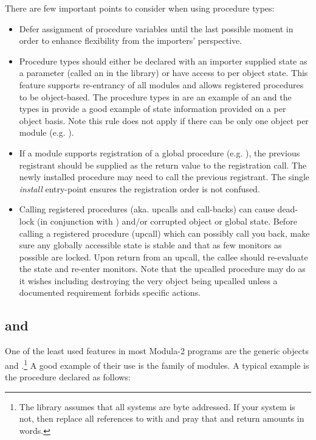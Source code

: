 There are few important points to consider when using procedure types:
\begin{itemize}
\item
    Defer assignment of procedure variables until the last possible moment
    in order to enhance flexibility from the importers' perspective.  
\item
    Procedure types should either be declared with an importer supplied
    state as a parameter (called an  in the library) 
    or have access 
    to per object state.  This feature supports re-entrancy of all modules and
    allows registered procedures to be object-based.  The procedure types
    in 
    are an example of an  and the types in
     provide a good example of state information
    provided on a per object basis.
    Note this rule does not apply if there can be only one object per module
    (e.g. ).
\item {}
    If a module supports registration of a global procedure
    (e.g. ), the previous registrant should
    be supplied as the return value to the registration call. 
    The newly installed procedure may need to call the previous registrant.
    The single {\em install} entry-point ensures the registration order
    is not confused.
\item {} 
    Calling registered procedures (aka. upcalls and call-backs)
    can cause dead-lock
    (in conjunction with ) and/or
    corrupted object or global state.
    Before calling a registered procedure (upcall)
    which can possibly call you back, make sure any globally accessible
    state is stable
    and that as few monitors as possible are locked.  Upon return from
    an upcall, the callee should re-evaluate the state and re-enter
    monitors.  Note that the upcalled procedure may do as it wishes
    including destroying the very object being upcalled unless
    a documented requirement forbids specific actions.
\end{itemize}

\subsection{ and }

One of the least used features in most Modula-2 programs are the
generic objects  and 
.\footnote{
    The library assumes that all systems are byte addressed.  If
    your system is not, then replace all references to  with 
     and pray that  and  return
    amounts in words.
    }
A good example of their use is the  family of modules.
A typical example is the procedure  declared
as follows:

